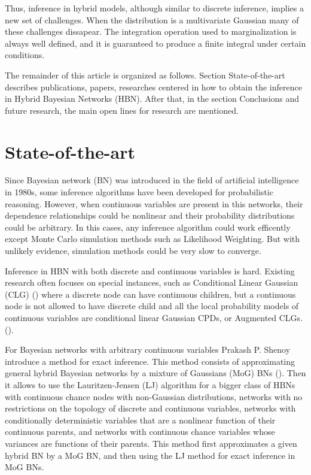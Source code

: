 \documentclass[a4paper,11pt]{article}
\begin{document}
Thus, inference in hybrid models, although similar to discrete inference, implies a new set of challenges. When the distribution is a multivariate Gaussian many of these challenges dissapear. The integration operation used to marginalization is always well defined, and it is guaranteed to produce a finite integral under certain conditions.

The remainder of this article is organized as follows. Section State-of-the-art describes publications, papers, researches centered in how to obtain the inference in Hybrid Bayesian Networks (HBN). After that, in the section Conclusions and future research, the main open lines for research are mentioned.

\section{State-of-the-art}

Since Bayesian network (BN) was introduced in the field of artificial intelligence in 1980s, some inference algorithms have been developed for probabilistic reasoning. However, when continuous variables are present in this networks, their dependence relationships could be nonlinear and their probability distributions could be arbitrary. In this cases, any inference algorithm could work efficently except Monte Carlo simulation methods such as Likelihood Weighting. But with unlikely evidence, simulation methods could be very slow to converge.

Inference in HBN with both discrete and continuous variables is hard. Existing research often focuses on special instances, such as Conditional Linear Gaussian (CLG)  (\cite{lauritzen1992}) where a discrete node can have continuous children, but a continuous node is not allowed to have discrete child and all the local probability models of continuous variables are conditional linear Gaussian CPDs,  or Augmented CLGs. (\cite{cogatedetcher2005}).

For Bayesian networks with arbitrary continuous variables Prakash P. Shenoy introduce a method for exact inference. This method consists of approximating general hybrid Bayesian networks by a mixture of Gaussians (MoG) BNs (\cite{shenoy2006}). Then it allows to use the Lauritzen-Jensen (LJ) algorithm for a bigger class of HBNs with continuous chance nodes with non-Gaussian distributions, networks with no restrictions on the topology of discrete and continuous variables, networks with conditionally deterministic variables that are a nonlinear function of their continuous parents, and networks with continuous chance variables whose variances are functions of their parents. This method first approximates a given hybrid BN by a MoG BN, and then using the LJ method for exact inference in MoG BNs. 
\end{document}
